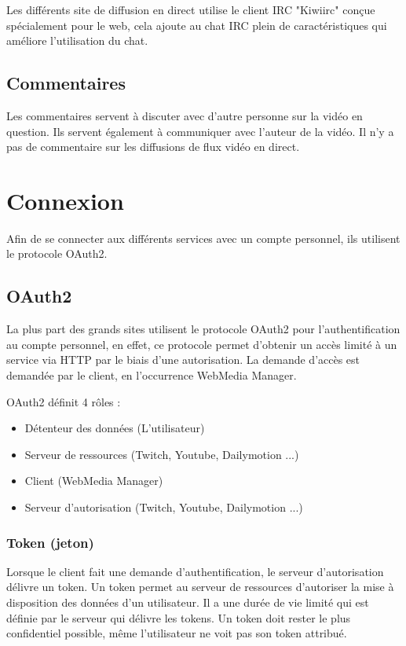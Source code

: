 \documentclass[11pt]{report} %
\begin{document}
		Les différents site de diffusion en direct utilise le client IRC "Kiwiirc" conçue spécialement pour le web, cela ajoute au chat IRC plein de caractéristiques qui améliore l'utilisation du chat.
		
		\subsection{Commentaires}
		Les commentaires servent à discuter avec d'autre personne sur la vidéo en question. Ils servent également à communiquer avec l'auteur de la vidéo.
		Il n'y a pas de commentaire sur les diffusions de flux vidéo en direct.
		
	\newpage
	\section{Connexion}
	Afin de se connecter aux différents services avec un compte personnel, ils utilisent le protocole OAuth2.
		\subsection{OAuth2}
		La plus part des grands sites utilisent le protocole OAuth2 pour l'authentification au compte personnel, en effet, ce protocole permet d'obtenir un accès limité à un service via HTTP par le biais d'une autorisation. 
		La demande d'accès est demandée par le client, en l'occurrence WebMedia Manager.
	
		OAuth2 définit 4 rôles :
		\begin{itemize}
			\item Détenteur des données (L'utilisateur)
			\item Serveur de ressources (Twitch, Youtube, Dailymotion ...)
			\item Client (WebMedia Manager)
			\item Serveur d'autorisation (Twitch, Youtube, Dailymotion ...)
		\end{itemize}
		
			\subsubsection{Token (jeton)}
			Lorsque le client fait une demande d'authentification, le serveur d'autorisation délivre un token. Un token permet au serveur de ressources d'autoriser la mise à disposition des données d'un utilisateur. Il a une durée de vie limité qui est définie par le serveur qui délivre les tokens.
			Un token doit rester le plus confidentiel possible, même l'utilisateur ne voit pas son token attribué.
			
\end{document}
